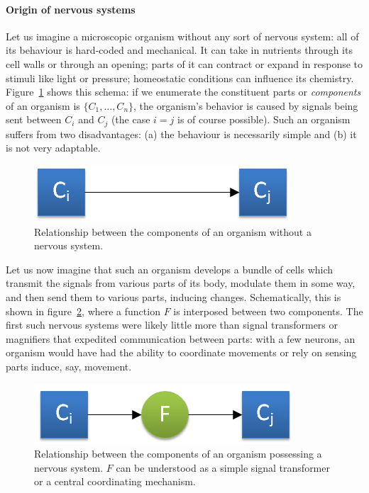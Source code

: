 \documentclass[]{scrartcl}
\begin{document}
\paragraph{Origin of nervous systems} Let us imagine a microscopic organism without any sort of nervous system: all of its behaviour is hard-coded and mechanical. It can take in nutrients through its cell walls or through an opening; parts of it can contract or expand in response to stimuli like light or pressure; homeostatic conditions can influence its chemistry. Figure~\ref{fig:noNervousSystem} shows this schema: if we enumerate the constituent parts or {\em components} of an organism is $\{C_1,\dots,C_n\}$, the organism's behavior is caused by signals being sent between $C_i$ and $C_j$ (the case $i=j$ is of course possible). Such an organism suffers from two disadvantages: (a) the behaviour is necessarily simple and (b) it is not very adaptable.

\begin{figure}
	\centering
	\includegraphics{figs/noNervousSystem.png}
	\caption{Relationship between the components of an organism without a nervous system.}
	\label{fig:noNervousSystem}
\end{figure}

Let us now imagine that such an organism develops a bundle of cells which transmit the signals from various parts of its body, modulate them in some way, and then send them to various parts, inducing changes. Schematically, this is shown in figure~\ref{fig:nervousSystem}, where a function $F$ is interposed between two components. The first such nervous systems were likely little more than signal transformers or magnifiers that expedited communication between parts: with a few neurons, an organism would have had the ability to coordinate movements or rely on sensing parts induce, say, movement.

\begin{figure}
	\centering
	\includegraphics{figs/nervousSystem.png}
	\caption{Relationship between the components of an organism possessing a nervous system. $F$ can be understood as a simple signal transformer or a central coordinating mechanism.}
	\label{fig:nervousSystem}
\end{figure}
\end{document}
